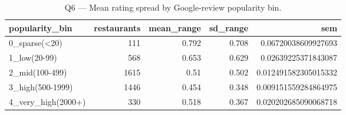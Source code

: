 \begin{table}[ht]
\centering
\caption{Q6 — Mean rating spread by Google-review popularity bin.}
\label{tab:q6_popularity_bins}
{\tiny
\begin{tabular}{lrrrr}
\toprule
popularity\_bin & restaurants & mean\_range & sd\_range & sem \\
\midrule
0\_sparse(<20) & 111 & 0.792 & 0.708 & 0.06720038609927693 \\
1\_low(20-99) & 568 & 0.653 & 0.629 & 0.02639225371843087 \\
2\_mid(100-499) & 1615 & 0.51 & 0.502 & 0.012491582305015332 \\
3\_high(500-1999) & 1446 & 0.454 & 0.348 & 0.009151559284864975 \\
4\_very\_high(2000+) & 330 & 0.518 & 0.367 & 0.020202685090068718 \\
\bottomrule
\end{tabular}
}
\end{table}
